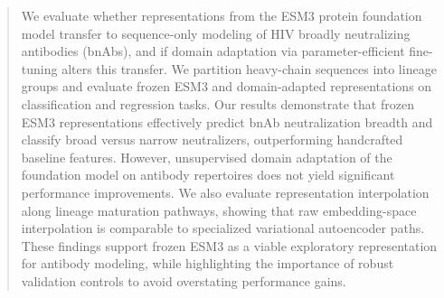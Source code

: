 \begin{abstract}
We evaluate whether representations from the ESM3 protein foundation model
transfer to sequence-only modeling of HIV broadly neutralizing antibodies
(bnAbs), and if domain adaptation via parameter-efficient fine-tuning alters
this transfer. We partition heavy-chain sequences into lineage groups and
evaluate frozen ESM3 and domain-adapted representations on classification and
regression tasks. Our results demonstrate that frozen ESM3 representations
effectively predict bnAb neutralization breadth and classify broad versus narrow
neutralizers, outperforming handcrafted baseline features. However, unsupervised
domain adaptation of the foundation model on antibody repertoires does not yield
significant performance improvements. We also evaluate representation
interpolation along lineage maturation pathways, showing that raw
embedding-space interpolation is comparable to specialized variational
autoencoder paths. These findings support frozen ESM3 as a viable exploratory
representation for antibody modeling, while highlighting the importance of
robust validation controls to avoid overstating performance gains.
\end{abstract}
